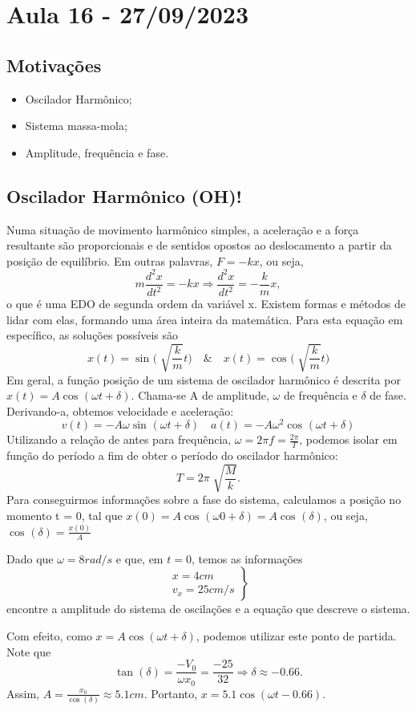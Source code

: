 \documentclass[PhysicsII/physicsII_notes.tex]{subfiles}
\begin{document}
\section{Aula 16 - 27/09/2023}
\subsection{Motivações}
\begin{itemize}
	\item Oscilador Harmônico;
	\item Sistema massa-mola;
	\item Amplitude, frequência e fase.
\end{itemize}
\subsection{Oscilador Harmônico (OH)!}
Numa situação de movimento harmônico simples, a aceleração e a força resultante são
proporcionais e de sentidos opostos ao deslocamento a partir da posição de equilíbrio.
Em outras palavras, \(F = -kx\), ou seja,
\[
	m\frac{d^{2}x}{dt^{2}}=-kx \Rightarrow \frac{d^{2}x}{dt^{2}}=-\frac{k}{m}x,
\]
o que é uma EDO de segunda ordem da variável x. Existem formas e métodos de lidar com elas,
formando uma área inteira da matemática. Para esta equação em específico, as soluções possíveis são
\[
	x(t)=\sin^{}{\biggl(\sqrt[]{\frac{k}{m}}t\biggr)} \quad\&\quad x(t)=\cos^{}{\biggl(\sqrt[]{\frac{k}{m}}t\biggr)}
\]
Em geral, a função posição de um sistema de oscilador harmônico é descrita por \(x(t) = A\cos^{}{(\omega t + \delta )}.\)
Chama-se A de amplitude, \(\omega \) de frequência e \(\delta \) de fase. Derivando-a, obtemos velocidade
e aceleração:
\[
	v(t) = -A\omega \sin^{}{(\omega t + \delta )}\quad a(t) = -A\omega^{2}\cos^{}{(\omega t + \delta )}
\]
Utilizando a relação de antes para frequência, \(\omega = 2\pi f = \frac{2\pi }{T}\), podemos
isolar em função do período a fim de obter o período do oscilador harmônico:
\[
	T = 2\pi \sqrt[]{\frac{M}{k}}.
\]
Para conseguirmos informações sobre a fase do sistema, calculamos a posição no momento t = 0, tal que
\(x(0) = A\cos^{}{(\omega 0 + \delta )} = A\cos^{}{(\delta )}\), ou seja, \(\cos^{}{(\delta )}=\frac{x(0)}{A}\)
\begin{example}
	Dado que \(\omega = 8 rad/s\) e que, em \(t=0\), temos as informações
	\[
		\left.\begin{array}{ll}
			x=4cm \\
			v_{x} = 25 cm/s
		\end{array}\right\}
	\]
	encontre a amplitude do sistema de oscilações e a equação que descreve o sistema.

	Com efeito, como \(x = A \cos{(\omega t + \delta )}\), podemos utilizar este ponto de partida. Note que
	\[
		\tan{(\delta )} = \frac{-V_{0}}{\omega x_{0}} = \frac{-25}{32} \Rightarrow \delta \approx -0.66.
	\]
	Assim, \(A = \frac{x_{0}}{\cos{(\delta )}}\approx 5.1cm\). Portanto, \(x = 5.1\cos{(\omega t - 0.66)}.\)
\end{example}
\end{document}
